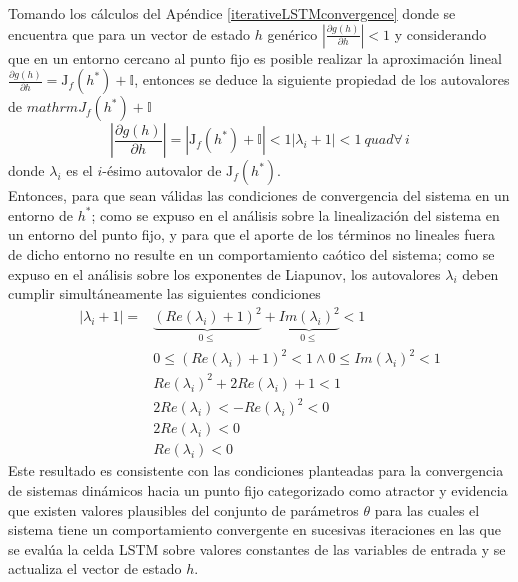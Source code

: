 \documentclass{article}
\begin{document}
	Tomando los cálculos del Apéndice \ref{iterativeLSTMconvergence} donde se encuentra que para un vector de estado $h$ genérico $\left\lvert \frac{\partial g(h)}{\partial h} \right\rvert < 1$ y considerando que en un entorno cercano al punto fijo es posible realizar la aproximación lineal $\frac{\partial g(h)}{\partial h} = \mathrm{J}_f(h^*) + \mathbb{I}$, entonces se deduce la siguiente propiedad de los autovalores de $mathrm{J}_f(h^*) + \mathbb{I}$
	\begin{equation*}
	\left\lvert \dfrac{\partial g(h)}{\partial h} \right\rvert = | \mathrm{J}_f(h^*) + \mathbb{I} | < 1
	|\lambda_i + 1| < 1 \ quad \forall \, i
	\end{equation*}
	donde $\lambda_i$ es el $i$-ésimo autovalor de $\mathrm{J}_f(h^*)$. \\
	Entonces, para que sean válidas las condiciones de convergencia del sistema en un entorno de $h^*$; como se expuso en el análisis sobre la linealización del sistema en un entorno del punto fijo, y para que el aporte de los términos no lineales fuera de dicho entorno no resulte en un comportamiento caótico del sistema; como se expuso en el análisis sobre los exponentes de Liapunov, los autovalores $\lambda_i$ deben cumplir simultáneamente las siguientes condiciones
	\begin{equation*}
	\begin{split}
	|\lambda_i + 1| = &\underbrace{(Re(\lambda_i) + 1)^2}_{0 \le} + \underbrace{Im(\lambda_i)^2}_{0 \le} < 1\\
	&0 \le (Re(\lambda_i) + 1)^2 < 1 \land 0 \le Im(\lambda_i)^2 < 1\\
	& Re(\lambda_i)^2 + 2Re(\lambda_i) + 1  < 1\\
	& 2Re(\lambda_i) < - Re(\lambda_i)^2 < 0\\
	& 2Re(\lambda_i) < 0\\
	& Re(\lambda_i) < 0
	\end{split}
	\end{equation*}
	Este resultado es consistente con las condiciones planteadas para la convergencia de sistemas dinámicos hacia un punto fijo categorizado como atractor y evidencia que existen valores plausibles del conjunto de parámetros $\theta$ para las cuales el sistema tiene un comportamiento convergente en sucesivas iteraciones en las que se evalúa la celda LSTM sobre valores constantes de las variables de entrada y se actualiza el vector de estado $h$.
	
\end{document}
